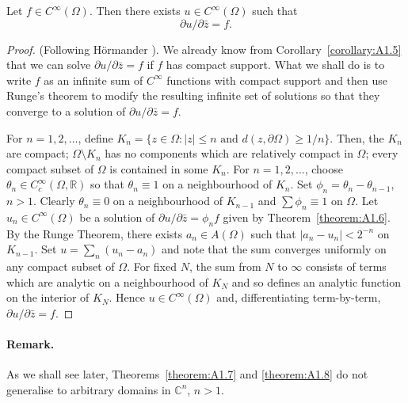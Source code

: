  Let $f\in C^\infty(\Omega)$. Then there exists $u\in C^\infty(\Omega)$ such that
\[ \partial u/\partial\bar z=f. \]
\begin{proof}
(Following H\"ormander \cite{bib:I:hormander-l:1}). We already know from Corollary~\ref{corollary:A1.5} that we can solve $\partial u/\partial\bar z=f$ if $f$ has compact support. What we shall do is to write $f$ as an infinite sum of $C^\infty$ functions with compact support and then use Runge's theorem to modify the resulting infinite set of solutions so that they converge to a solution of $\partial u/\partial\bar z=f$.

For $n=1,2,\ldots$, define $K_n=\{z\in\Omega:|z|\leq n\text{ and }d(z,\partial\Omega)\geq1/n\}$. Then, the $K_n$ are compact; $\Omega\setminus K_n$ has no components which are relatively compact in $\Omega$; every compact subset of $\Omega$ is contained in some $K_n$. For $n=1,2,\ldots$, choose $\theta_n\in C_c^\infty(\Omega,\mathbb R)$ so that $\theta_n\equiv1$ on a neighbourhood of $K_n$. Set $\phi_n=\theta_n-\theta_{n-1}$, $n>1$. Clearly $\theta_n\equiv0$ on a neighbourhood of $K_{n-1}$ and $\sum\phi_n\equiv1$ on $\Omega$. Let $u_n\in C^\infty(\Omega)$ be a solution of $\partial u/\partial\bar z=\phi_n f$ given by Theorem~\ref{theorem:A1.6}. By the Runge Theorem, there exists $a_n\in A(\Omega)$ such that $|a_n-u_n|<2^{-n}$ on $K_{n-1}$. Set $u=\sum_n(u_n-a_n)$ and note that the sum converges uniformly on any compact subset of $\Omega$. For fixed $N$, the sum from $N$ to $\infty$ consists of terms which are analytic on a neighbourhood of $K_N$ and so defines an analytic function on the interior of $K_N$. Hence $u\in C^\infty(\Omega)$ and, differentiating term-by-term, $\partial u/\partial\bar z=f$.
\end{proof}
\paragraph*{Remark.} As we shall see later, Theorems~\ref{theorem:A1.7} and \ref{theorem:A1.8} do not generalise to arbitrary domains in $\mathbb C^n$, $n>1$.
